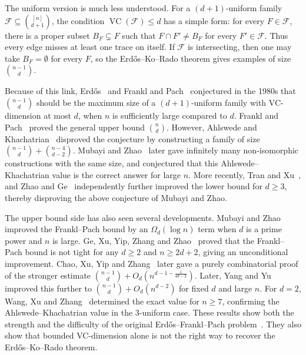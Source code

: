 \documentclass[11pt]{article}
\theoremstyle{definition}
\newcommand{\cF}{\mathcal{F}}
\newcommand{\VC}{\operatorname{VC}}
\begin{document}
The uniform version is much less understood. For a \((d+1)\)-uniform family \(\cF\subseteq\binom{[n]}{d+1}\), the condition \(\VC(\cF)\le d\) has a simple form: for every \(F\in\cF\), there is a proper subset \(B_F\subsetneq F\) such that \(F\cap F'\ne B_F\) for every \(F'\in\cF\). Thus every edge misses at least one trace on itself. If \(\cF\) is intersecting, then one may take \(B_F=\emptyset\) for every \(F\), so the Erd\H{o}s--Ko--Rado theorem gives examples of size \(\binom{n-1}{d}\).

Because of this link, Erd\H{o}s~\cite{1984Erdos} and Frankl and Pach~\cite{1984Franklpach} conjectured in the 1980s that \(\binom{n-1}{d}\) should be the maximum size of a \((d+1)\)-uniform family with VC-dimension at most \(d\), when \(n\) is sufficiently large compared to \(d\). Frankl and Pach~\cite{1984Franklpach} proved the general upper bound \(\binom{n}{d}\). However, Ahlswede and Khachatrian~\cite{1997CombFan} disproved the conjecture by constructing a family of size \(\binom{n-1}{d}+\binom{n-4}{d-2}\). Mubayi and Zhao~\cite{2007JAC} later gave infinitely many non-isomorphic constructions with the same size, and conjectured that this Ahlswede--Khachatrian value is the correct answer for large \(n\). More recently, Tran and Xu~\cite{2026TranXu}, and Zhao and Ge~\cite{2026GeZhao} independently further improved the lower bound for \(d\ge 3\), thereby disproving the above conjecture of Mubayi and Zhao.

The upper bound side has also seen several developments. Mubayi and Zhao~\cite{2007JAC} improved the Frankl--Pach bound by an \(\Omega_d(\log n)\) term when \(d\) is a prime power and \(n\) is large. Ge, Xu, Yip, Zhang and Zhao~\cite{2024FranklPach} proved that the Frankl--Pach bound is not tight for any \(d\ge2\) and \(n\ge 2d+2\), giving an unconditional improvement. Chao, Xu, Yip and Zhang~\cite{2025CombProof} later gave a purely combinatorial proof of the stronger estimate \(\binom{n-1}{d}+O_d(n^{d-1-\frac{1}{4d-2}})\). Later, Yang and Yu~\cite{2025YangYu} improved this further to \(\binom{n-1}{d}+O_d(n^{d-2})\) for fixed \(d\) and large \(n\). For \(d=2\), Wang, Xu and Zhang~\cite{2025ThreeUniform} determined the exact value for \(n\ge 7\), confirming the Ahlswede--Khachatrian value in the 3-uniform case. These results show both the strength and the difficulty of the original Erd\H{o}s--Frankl--Pach problem~\cite{1984Erdos,1984Franklpach}. They also show that bounded VC-dimension alone is not the right way to recover the Erd\H{o}s--Ko--Rado theorem.
\end{document}
